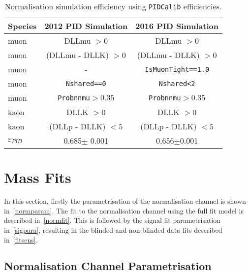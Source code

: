 \begin{table}[H]
\begin{center}
\begin{tabular}{l c c}\toprule

    Species  &2012 PID Simulation & 2016 PID Simulation\\ \hline
    muon &  DLLmu $ > 0$ & DLLmu $ > 0$ \\
    muon &  (DLLmu - DLLK) $ > 0$ & (DLLmu - DLLK) $ > 0$ \\
    muon &  - & \texttt{IsMuonTight==1.0}\\
    muon & \texttt{Nshared==0} & \texttt{Nshared<2} \\
    muon & \texttt{Probnnmu}$>0.35$ & \texttt{Probnnmu}$>0.35$ \\
    kaon &  DLLK $ > 0$ & DLLK $ > 0$ \\
    kaon &  (DLLp - DLLK) $ < 5$ & (DLLp - DLLK) $< 5$ \\
     \hline
    $\varepsilon_{PID}$ &0.685$\pm$ 0.001 & 0.656$\pm$0.001  \\

     \bottomrule
      \end{tabular}

\end{center}
\caption{Normalisation simulation efficiency using \texttt{PIDCalib} efficiencies.}
\label{tab:PIDselectionNorm}
\end{table}


\newpage
\section{Mass Fits}
In this section, firstly the parametrisation of the normalisation channel is shown in~\autoref{normparam}. The fit to the normalisation channel using the full fit model is described in~\autoref{normfit}. This is followed by the signal fit parametrisation in~\autoref{sigpara}, resulting in the blinded and non-blinded data fits described in~\autoref{fitsens}.

\subsection{Normalisation Channel Parametrisation}
\label{normparam}

